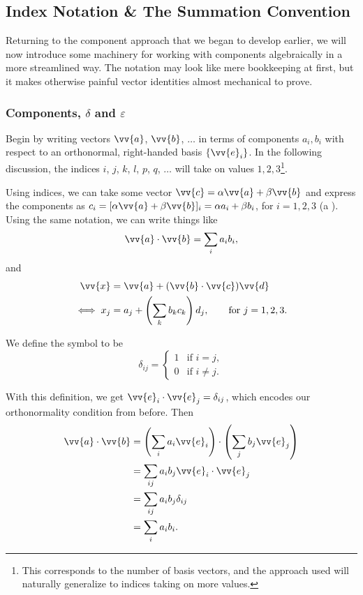 \subsection{Index Notation \& The Summation Convention}

Returning to the component approach that we began to develop earlier, we will now introduce some machinery for working with components algebraically in a more streamlined way. The notation may look like mere bookkeeping at first, but it makes otherwise painful vector identities almost mechanical to prove.

\subsubsection{Components, $\delta$ and $\varepsilon$}

Begin by writing vectors $\vv{a}$, $\vv{b}$, $\dots$ in terms of components $a_i, b_i$ with respect to an orthonormal, right-handed basis $\{\vv{e}_i\}$. In the following discussion, the indices $i$, $j$, $k$, $l$, $p$, $q$, $\dots$ will take on values $1, 2, 3$\footnote{This corresponds to the number of basis vectors, and the approach used will naturally generalize to indices taking on more values.}.

Using indices, we can take some vector $\vv{c} = \alpha \vv{a} + \beta \vv{b}$ and express the components as $c_i = [\alpha \vv{a} + \beta \vv{b}]_i = \alpha a_i + \beta b_i$, for $i = 1, 2, 3$ (a ). Using the same notation, we can write things like
$$
\vv{a} \cdot \vv{b} = \sum_i a_i b_i,
$$
and
\begin{align*}
    \vv{x} &= \vv{a} + (\vv{b} \cdot \vv{c}) \vv{d} \\
\iff x_j &= a_j + \left(\sum_k b_k c_k\right) d_j, \quad \quad \text{for }j = 1, 2, 3.
\end{align*}

\begin{definition}
    We define the  symbol to be
    $$
    \delta_{ij} = \begin{cases}
        1 &\mbox{if } i = j, \\
        0 &\mbox{if } i \neq j.
       \end{cases}
    $$
\end{definition}

With this definition, we get $\vv{e}_i \cdot \vv{e}_j = \delta_{ij}$, which encodes our orthonormality condition from before. Then
\begin{align*}
    \vv{a} \cdot \vv{b} &= \left(\sum_i a_i \vv{e}_i\right)\cdot\left(\sum_j b_j \vv{e}_j\right) \\
    &= \sum_{ij} a_i b_j \vv{e}_i \cdot \vv{e}_j \\
    &= \sum_{ij} a_i b_j \delta_{ij} \\
    &= \sum_i a_i b_i.
\end{align*}

